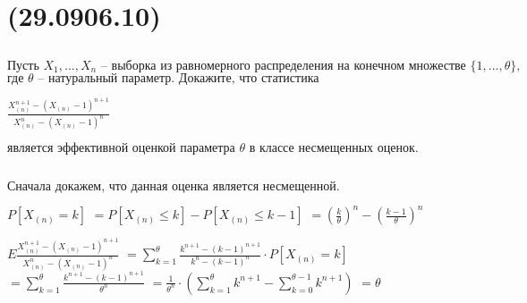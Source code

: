 \documentclass[13pt,a4paper]{scrartcl}
\def\suml{\sum\limits}
\def\prodl{\mul\limits}
\begin{document}
\def\th{\theta}
\def\prodl{\prod\limits}
\def\dd#1#2{\frac{\partial{#1}}{\partial{#2}}}
\def\maxl{\max\limits}

\section*{\allowbreak {}\allowbreak (29.09\text{ -- }06.10)}

\subsection*{\allowbreak }

\def\Xn{X_{(n)}}

\(\text{Пусть }\allowbreak X_1,..., X_n\text{ -- }\text{выборка }\allowbreak \text{из }\allowbreak \text{равномерного }\allowbreak \text{распределения }\allowbreak \text{на }\allowbreak \text{конечном }\allowbreak \text{множестве }\allowbreak \{ 1,..., \th \},\)
\(\text{где }\allowbreak \th\text{ -- }\text{натуральный }\allowbreak \text{параметр. }\allowbreak \text{Докажите, }\allowbreak \text{что }\allowbreak \text{статистика}\allowbreak \)

\(\frac{\Xn^{n + 1} - (\Xn - 1)^{n + 1} }{\Xn^n - (\Xn - 1)^n}\)
\medskip

\(\text{является }\allowbreak \text{эффективной }\allowbreak \text{оценкой }\allowbreak \text{параметра }\allowbreak \th\text{ в }\allowbreak \text{классе }\allowbreak \text{несмещенных }\allowbreak \text{оценок.}\allowbreak \)

\subsection*{\allowbreak }

\subsubsection*{\allowbreak }

\(\text{Сначала }\allowbreak \text{докажем, }\allowbreak \text{что }\allowbreak \text{данная }\allowbreak \text{оценка }\allowbreak \text{является }\allowbreak \text{несмещенной.}\allowbreak \)

\(P[\Xn = k]\)
\(= P[\Xn \le  k] - P[\Xn \le  k - 1]\)
\(= (\frac{k }{\th})^n - (\frac{k - 1 }{\th})^n\)

\(E \frac{\Xn^{n + 1} - (\Xn - 1)^{n + 1} }{\Xn^n - (\Xn - 1)^n}\)
\(= \suml_{k = 1}^{\th} \frac{k^{n + 1} - (k - 1)^{n + 1} }{k^n - (k - 1)^n}\cdot  P[\Xn = k]\)
\(= \suml_{k = 1}^{\th} \frac{k^{n + 1} - (k - 1)^{n + 1} }{\th^n}\)
\(= \frac{1 }{\th^n}\cdot  (\suml_{k = 1}^{\th} k^{n + 1} - \suml_{k = 0}^{\th-1} k^{n + 1})\)
\(= \th\)
\end{document}

